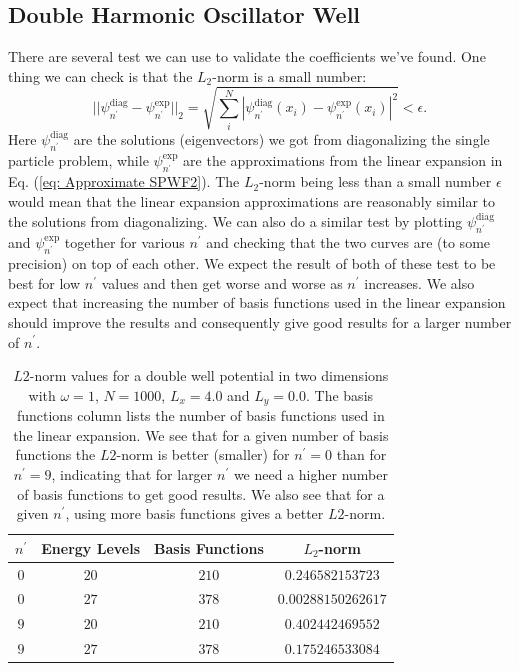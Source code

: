 \documentclass[../main.tex]{subfiles}
\begin{document}
\subsection{Double Harmonic Oscillator Well}
There are several test we can use to validate the coefficients we've found. One thing we can check is that the $L_2$-norm is a small number:
\begin{equation}
    ||\psi_{n^\prime}^\textrm{diag}-\psi_{n^\prime}^\textrm{exp}||_2 = \sqrt{\sum_i^N |\psi_{n^\prime}^\textrm{diag}(x_i)-\psi_{n^\prime}^\textrm{exp}(x_i)|^2} < \epsilon.
\end{equation}
Here $\psi_{n^\prime}^\textrm{diag}$ are the solutions (eigenvectors) we got from diagonalizing the single particle problem, while $\psi_{n^\prime}^\textrm{exp}$ are the approximations from the linear expansion in Eq. (\ref{eq: Approximate SPWF2}). The $L_2$-norm being less than a small number $\epsilon$ would mean that the linear expansion approximations are reasonably similar to the solutions from diagonalizing. We can also do a similar test by plotting $\psi_{n^\prime}^\textrm{diag}$ and $\psi_{n^\prime}^\textrm{exp}$ together for various $n^\prime$ and checking that the two curves are (to some precision) on top of each other. We expect the result of both of these test to be best for low $n^\prime$ values and then get worse and worse as $n^\prime$ increases. We also expect that increasing the number of basis functions used in the linear expansion should improve the results and consequently give good results for a larger number of $n^\prime$.

\begin{table}[!ht]
  \centering
  \begin{tabular}{ | c | c | c | c | }
    \hline
    $n^\prime$ & Energy Levels & Basis Functions & $L_2$-norm\\*
    \hline
    $0$ & $20$ & $210$ & $0.246582153723$ %
    \\*
    \hline
    $0$ & $27$ & $378$ & $0.00288150262617$ %
    \\*
    \hline
    $9$ & $20$ & $210$ & $0.402442469552$ %
    \\*
    \hline
    $9$ & $27$ & $378$ & $0.175246533084$ %
    \\*
    \hline
  \end{tabular}
  \caption{$L2$-norm values for a double well potential in two dimensions with $\omega = 1$, $N = 1000$, $L_x = 4.0$ and $L_y = 0.0$. The basis functions column lists the number of basis functions used in the linear expansion. We see that for a given number of basis functions the $L2$-norm is better (smaller) for $n^\prime = 0$ than for $n^\prime = 9$, indicating that for larger $n^\prime$ we need a higher number of basis functions to get good results. We also see that for a given $n^\prime$, using more basis functions gives a better $L2$-norm.}
  \label{tab:L2-norm}
\end{table}
\end{document}
